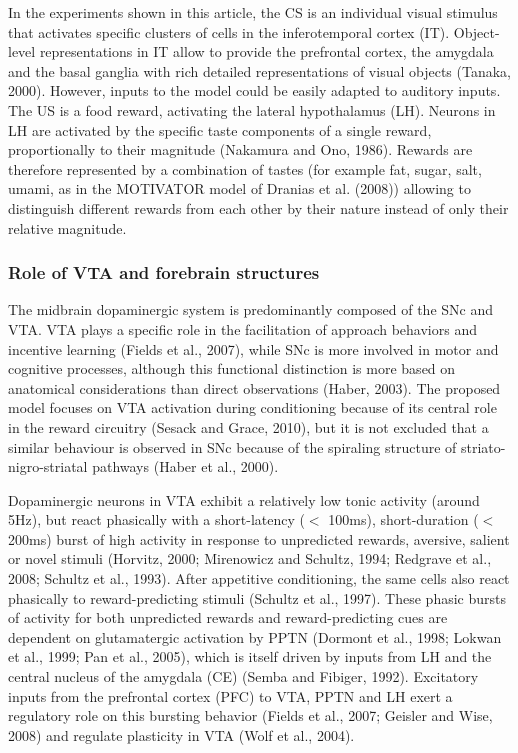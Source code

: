 \documentclass[
  11pt,
  a4paper,
]{scrbook}
\begin{document}
In the experiments shown in this article, the CS is an individual visual
stimulus that activates specific clusters of cells in the inferotemporal
cortex (IT). Object-level representations in IT allow to provide the
prefrontal cortex, the amygdala and the basal ganglia with rich detailed
representations of visual objects (Tanaka, 2000). However, inputs to the
model could be easily adapted to auditory inputs. The US is a food
reward, activating the lateral hypothalamus (LH). Neurons in LH are
activated by the specific taste components of a single reward,
proportionally to their magnitude (Nakamura and Ono, 1986). Rewards are
therefore represented by a combination of tastes (for example fat,
sugar, salt, umami, as in the MOTIVATOR model of Dranias et al. (2008))
allowing to distinguish different rewards from each other by their
nature instead of only their relative magnitude.

\subsubsection*{Role of VTA and forebrain
structures}\label{role-of-vta-and-forebrain-structures}

The midbrain dopaminergic system is predominantly composed of the SNc
and VTA. VTA plays a specific role in the facilitation of approach
behaviors and incentive learning (Fields et al., 2007), while SNc is
more involved in motor and cognitive processes, although this functional
distinction is more based on anatomical considerations than direct
observations (Haber, 2003). The proposed model focuses on VTA activation
during conditioning because of its central role in the reward circuitry
(Sesack and Grace, 2010), but it is not excluded that a similar
behaviour is observed in SNc because of the spiraling structure of
striato-nigro-striatal pathways (Haber et al., 2000).

Dopaminergic neurons in VTA exhibit a relatively low tonic activity
(around 5Hz), but react phasically with a short-latency (\(<\) 100ms),
short-duration (\(<\) 200ms) burst of high activity in response to
unpredicted rewards, aversive, salient or novel stimuli (Horvitz, 2000;
Mirenowicz and Schultz, 1994; Redgrave et al., 2008; Schultz et al.,
1993). After appetitive conditioning, the same cells also react
phasically to reward-predicting stimuli (Schultz et al., 1997). These
phasic bursts of activity for both unpredicted rewards and
reward-predicting cues are dependent on glutamatergic activation by PPTN
(Dormont et al., 1998; Lokwan et al., 1999; Pan et al., 2005), which is
itself driven by inputs from LH and the central nucleus of the amygdala
(CE) (Semba and Fibiger, 1992). Excitatory inputs from the prefrontal
cortex (PFC) to VTA, PPTN and LH exert a regulatory role on this
bursting behavior (Fields et al., 2007; Geisler and Wise, 2008) and
regulate plasticity in VTA (Wolf et al., 2004).
\end{document}
